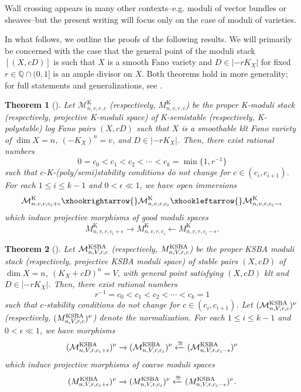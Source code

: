 \documentclass[11pt]{amsart}
\numberwithin{equation}{section}
\newtheorem{theorem}{Theorem}[section]
\theoremstyle{definition}
\newcommand{\bQ}{\mathbb{Q}}
\newcommand{\KSBA}{{\rm KSBA}}
\newcommand{\cM}{\mathcal M}
\newcommand{\K}{\mathrm{K}}
\begin{document}
Wall crossing appears in many other contexts--e.g. moduli of vector bundles or sheaves--but the present writing will focus only on the case of moduli of varieties.

In what follows, we outline the proofs of the following results.  We will primarily be concerned with the case that the general point of the moduli stack $[(X,cD)]$ is such that $X$ is a smooth Fano variety and $D \in |-rK_X|$ for fixed $r \in \bQ \cap (0,1]$ is an ample divisor on $X$.  Both theorems hold in more generality; for full statements and generalizations, see \cite{ABIP, MZ, ADLpub, Zhou}. 

\begin{theorem}[\cite{ADLpub}]\label{thm:introKwallcrossing}
Let $\cM^\K_{n,v,r,c}$ (respectively, $M^\K_{n,v,r,c}$) be the proper K-moduli stack (respectively, projective K-moduli space) of K-semistable (respectively, K-polystable) log Fano pairs $(X,cD)$ such that $X$ is a smoothable klt Fano variety of $\dim X = n$, $(-K_X)^n = v$, and $D \in |-rK_X|$.  Then, there exist rational numbers \[0=c_0<c_1<c_2<\cdots<c_k=\min\{1,r^{-1}\}\] such that $c$-K-(poly/semi)stability conditions do not change for $c\in (c_i,c_{i+1})$. For each $1\leq i\leq k-1$ and $0<\epsilon\ll 1$, we have open immersions
 \[
 \cM^\K_{n,v,r,c_i+\epsilon}\xhookrightarrow{}
 \cM^\K_{n,v,r,c_i}\xhookleftarrow{}\cM^\K_{n,v,r,c_i-\epsilon}
 \]
 which induce projective morphisms of good moduli spaces
 \[
 M^\K_{n,v,r,c_i+\epsilon}\xrightarrow{}
 M^\K_{n,v,r,c_i}\xleftarrow{}M^\K_{n,v,r,c_i-\epsilon}.
 \]
\end{theorem}

\begin{theorem}[\cite{ABIP}]\label{thm:introKSBAwallcrossing}
Let $\cM^{\KSBA}_{n,V,r,c}$ (respectively, $M^{\KSBA}_{n,V,r,c}$) be the proper KSBA moduli stack (respectively, projective KSBA moduli space) of stable pairs $(X,cD)$ of $\dim X = n$, $(K_X+cD)^n = V$, with general point satisfying $(X,cD)$ klt and $D \in |-rK_X|$.  Then, there exist rational numbers \[r^{-1}=c_0<c_1<c_2<\cdots<c_k=1\] such that $c$-stability conditions do not change for $c\in (c_i,c_{i+1})$.  Let $(\cM^{\KSBA}_{n,V,r,c})^\nu$ (respectively, $(M^{\KSBA}_{n,V,r,c})^\nu$) denote the normalization.  For each $1\leq i\leq k-1$ and $0<\epsilon\ll 1$, we have morphisms
 \[
 (\cM^{\KSBA}_{n,V,r,c_i+\epsilon})^\nu\xrightarrow{}
 (\cM^{\KSBA}_{n,V,r,c_i})^\nu\xleftarrow{\cong}(\cM^{\KSBA}_{n,V,r,c_i-\epsilon})^\nu
 \]
which induce projective morphisms of coarse moduli spaces
 \[
 (M^{\KSBA}_{n,V,r,c_i+\epsilon})^\nu\xrightarrow{}
 (M^{\KSBA}_{n,V,r,c_i})^\nu\xleftarrow{\cong}(M^{\KSBA}_{n,V,r,c_i-\epsilon})^\nu.
 \]
\end{theorem}
\end{document}
